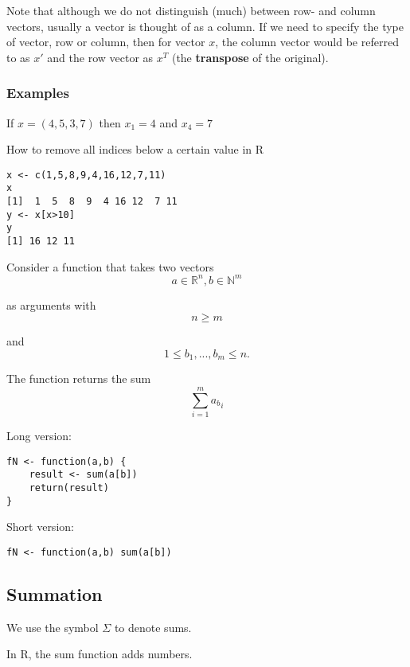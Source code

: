\documentclass[12pt,a4paper]{article}
\theoremstyle{regla}
\theoremstyle{remark}
\theoremstyle{definition}
\theoremstyle{nonumberbreak}
\begin{document}
Note that although we do not distinguish (much) between row- and column vectors, usually a vector is thought of as a column. If we need to specify the type of vector, row or column, then for vector $x$, the column vector would be referred to as  $x'$ and the row vector as $x^T$ (the {\bf transpose} of the original).
\subsubsection{Examples}
\begin{xmpl}
If $x=(4,5,3,7)$ then $x_1=4$ and $x_4=7$

\end{xmpl}
\begin{xmpl}
How to remove all indices below a certain value in R
\begin{lstlisting}
x <- c(1,5,8,9,4,16,12,7,11)
x
[1]  1  5  8  9  4 16 12  7 11
y <- x[x>10]
y
[1] 16 12 11
\end{lstlisting}
\end{xmpl}

\begin{xmpl}
Consider a function that takes two vectors $$a \in \mathbb{R}^n, b \in \mathbb{N}^m$$

as arguments with $$n \geq m$$

and $$1 \leq b_1,...,b_m \leq n.$$

The function returns the sum \begin{equation}\sum_{i = 1}^m {a_b}_i \end{equation}

Long version:
\begin{lstlisting}
fN <- function(a,b) {
	result <- sum(a[b])
	return(result)
}
\end{lstlisting}

Short version:
\begin{lstlisting}
fN <- function(a,b) sum(a[b])
\end{lstlisting}

\end{xmpl}


\subsection{Summation}
\begin{fbox}
\begin{minipage}{0.97\textwidth}
We use the symbol $\Sigma$ to denote sums.

In R, the sum function adds numbers.
\end{minipage}
\end{fbox}
\end{document}
